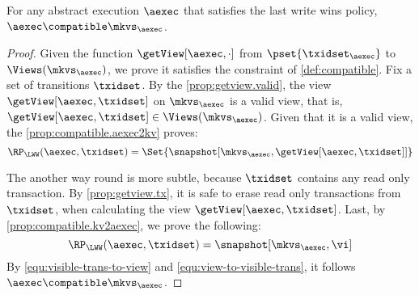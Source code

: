 \begin{theorem}
\label{thm:aexec2kv.compatible}
For any abstract execution $\aexec$ that satisfies the last write wins policy, $\aexec \compatible \mkvs_{\aexec}$.
\end{theorem}
\begin{proof}
Given the function $\getView[\aexec, \cdot]$ from $\pset{\txidset_{\aexec}}$ to $\Views(\mkvs_{\aexec})$,
we prove it satisfies the constraint of \cref{def:compatible}.
Fix a set of transitions \( \txidset \).
By the \cref{prop:getview.valid}, the view $\getView[\aexec, \txidset]$  on \( \mkvs_\aexec \) is a valid view,
that is, \( \getView[\aexec, \txidset] \in \Views(\mkvs_\aexec) \).
Given that it is a valid view, the \cref{prop:compatible.aexec2kv} proves:
\begin{equation}
    \label{equ:visible-trans-to-view}
    \RP_{\LWW}(\aexec, \txidset) = \Set{\snapshot[\mkvs_{\aexec}, \getView[\aexec, \txidset]]} 
\end{equation}

The another way round is more subtle,
because \( \txidset \) contains any read only transaction.
By \cref{prop:getview.tx}, it is safe to erase read only transactions from \( \txidset \),
when calculating the view \( \getView[\aexec, \txidset] \).
Last, by \cref{prop:compatible.kv2aexec}, we prove the following:
\begin{equation}
    \label{equ:view-to-visible-trans}
    \RP_{\LWW}(\aexec, \txidset) = \snapshot[\mkvs_{\aexec}, \vi]
\end{equation}
By \cref{equ:visible-trans-to-view} and \cref{equ:view-to-visible-trans},
it follows \( \aexec \compatible \mkvs_{\aexec} \).
\end{proof}


